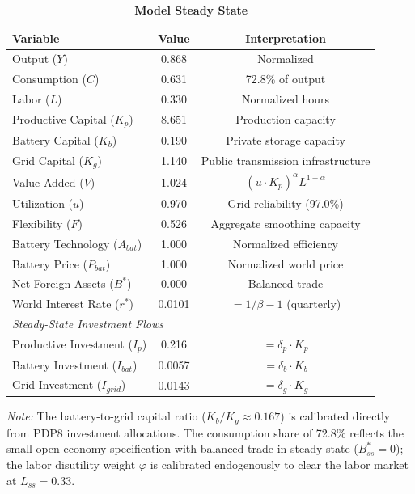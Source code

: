 \documentclass[12pt, a4paper]{article}
\begin{document}
\begin{table}[H]
    \centering
    \caption{\textbf{Model Steady State}}
    \label{tab:steady_state}
    \renewcommand{\arraystretch}{1.3}
    \begin{tabular}{lcc}
        \toprule
        \textbf{Variable} & \textbf{Value} & \textbf{Interpretation} \\
        \midrule
        Output ($Y$) & 0.868 & Normalized \\
        Consumption ($C$) & 0.631 & 72.8\% of output \\
        Labor ($L$) & 0.330 & Normalized hours \\
        Productive Capital ($K_p$) & 8.651 & Production capacity \\
        Battery Capital ($K_b$) & 0.190 & Private storage capacity \\
        Grid Capital ($K_g$) & 1.140 & Public transmission infrastructure \\
        Value Added ($V$) & 1.024 & $(u \cdot K_p)^\alpha L^{1-\alpha}$ \\
        Utilization ($u$) & 0.970 & Grid reliability (97.0\%) \\
        Flexibility ($F$) & 0.526 & Aggregate smoothing capacity \\
        Battery Technology ($A_{bat}$) & 1.000 & Normalized efficiency \\
        Battery Price ($P_{bat}$) & 1.000 & Normalized world price \\
        Net Foreign Assets ($B^*$) & 0.000 & Balanced trade \\
        World Interest Rate ($r^*$) & 0.0101 & $= 1/\beta - 1$ (quarterly) \\
        \midrule
        \multicolumn{3}{l}{\textit{Steady-State Investment Flows}} \\
        Productive Investment ($I_p$) & 0.216 & $= \delta_p \cdot K_p$ \\
        Battery Investment ($I_{bat}$) & 0.0057 & $= \delta_b \cdot K_b$ \\
        Grid Investment ($I_{grid}$) & 0.0143 & $= \delta_g \cdot K_g$ \\
        \bottomrule
    \end{tabular}
    \vspace{0.2cm}
    \parbox{\textwidth}{\footnotesize \textit{Note:} The battery-to-grid capital ratio ($K_b / K_g \approx 0.167$) is calibrated directly from PDP8 investment allocations. The consumption share of 72.8\% reflects the small open economy specification with balanced trade in steady state ($B^*_{ss} = 0$); the labor disutility weight $\varphi$ is calibrated endogenously to clear the labor market at $L_{ss} = 0.33$.}
\end{table}
\end{document}
